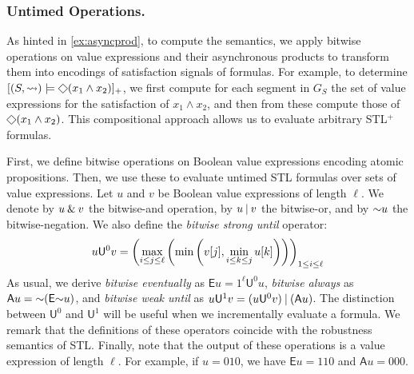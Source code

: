 \subsubsection{Untimed Operations.}
As hinted in \cref{ex:asyncprod}, to compute the semantics, we apply bitwise operations on value expressions and their asynchronous products to transform them into encodings of satisfaction signals of formulas.
For example, to determine $[(S, {\hb}) \models \LTLeventually (x_1 \land x_2)]_+$, we first compute for each segment in $G_S$ the set of value expressions for the satisfaction of $x_1 \land x_2$, and then from these compute those of $\LTLeventually (x_1 \land x_2)$.
This compositional approach allows us to evaluate arbitrary STL$^+$ formulas.

First, we define bitwise operations on Boolean value expressions encoding atomic propositions.
Then, we use these to evaluate untimed STL formulas over sets of value expressions.
%
Let $u$ and $v$ be Boolean value expressions of length $\ell$.
We denote by $u \mathbin{\&} v$ the bitwise-and operation, by $u \mathbin{|} v$ the bitwise-or, and by $\mathord{\sim} u$ the bitwise-negation.
We also define the \emph{bitwise strong until} operator:
%
\[\small u \mathsf{U}^0 v = \left( \max_{i \leq j \leq \ell} \left( \min \left( v[j], \min_{i \leq k \leq j} u[k] \right) \right) \right)_{1 \leq i \leq \ell} \]
\normalsize
%
As usual, we derive \emph{bitwise eventually} as 
$\mathsf{E} u = 1^\ell \mathsf{U}^0 u$, \emph{bitwise always} as $\mathsf{A} u = \mathord{\sim} 
(\mathsf{E} \mathord{\sim} u)$, and \emph{bitwise weak until} as $u \mathsf{U}^1 v = (u \mathsf{U}^0 v) 
\mathbin{|} (\mathsf{A} u)$.
The distinction between $\mathsf{U}^0$ and $\mathsf{U}^1$ will be useful when we incrementally evaluate a formula.
We remark that the definitions of these operators coincide with the robustness semantics of STL.
Finally, note that the output of these operations is a value expression of length $\ell$.
For example, if $u = 010$, we have $\mathsf{E} u = 110$ and $\mathsf{A} u = 000$.



